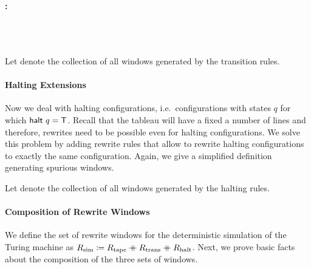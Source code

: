 \paragraph{:}
\begin{center}
  \quad {}\\
  \quad {} 
  \quad {} \\
  \quad {}
\end{center}

Let \mnotec[transRules]{$\Rtrans$} denote the collection of all windows generated by the transition rules. 

\paragraph{Halting Extensions}
Now we deal with halting configurations, i.e.\ configurations with states $q$ for which $\textsf{halt}~q = \mathsf{T}$. Recall that the tableau will have a fixed a number of lines and therefore, rewrites need to be possible even for halting configurations. We solve this problem by adding rewrite rules that allow to rewrite halting configurations to exactly the same configuration. Again, we give a simplified definition generating spurious windows.

\begin{center}
  \quad {}
  \quad {}
\end{center}

Let \mnotec[haltRules]{$\Rhalt$} denote the collection of all windows generated by the halting rules.

\paragraph{Composition of Rewrite Windows}
We define the set of rewrite windows \mnotec[simRules]{$\Rsim$} for the deterministic simulation of the Turing machine as $R_{\text{sim}} \coloneqq R_{\text{tape}} \mathbin{+\mkern-10mu+} R_{\text{trans}} \mathbin{+\mkern-10mu+} R_{\text{halt}}$.
Next, we prove basic facts about the composition of the three sets of windows. 

